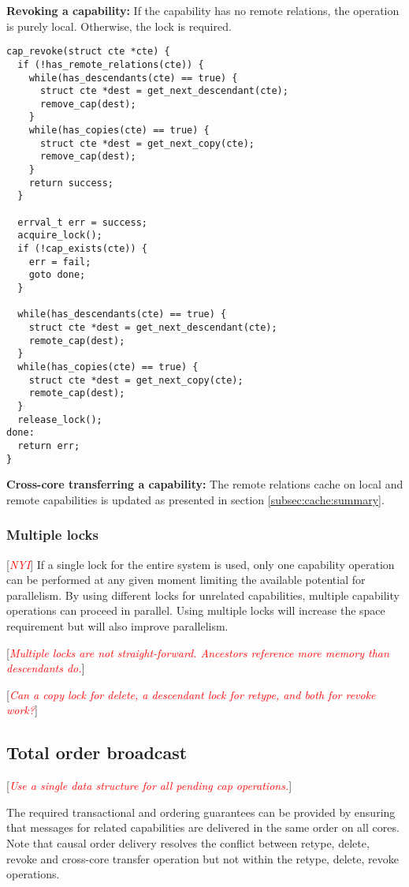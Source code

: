 \documentclass[a4paper,twoside]{report} %
\newcommand{\note}[1]{[\textcolor{red}{\textit{#1}}]}
\begin{document}
\textbf{Revoking a capability:} If the capability has no remote
relations, the operation is purely local. Otherwise, the lock is
required.

\begin{verbatim}
cap_revoke(struct cte *cte) {
  if (!has_remote_relations(cte)) {
    while(has_descendants(cte) == true) {
      struct cte *dest = get_next_descendant(cte);
      remove_cap(dest);
    }
    while(has_copies(cte) == true) {
      struct cte *dest = get_next_copy(cte);
      remove_cap(dest);
    }
    return success;
  }

  errval_t err = success;
  acquire_lock();
  if (!cap_exists(cte)) {
    err = fail;
    goto done;
  }

  while(has_descendants(cte) == true) {
    struct cte *dest = get_next_descendant(cte);
    remote_cap(dest);
  }
  while(has_copies(cte) == true) {
    struct cte *dest = get_next_copy(cte);
    remote_cap(dest);
  }
  release_lock();
done:
  return err;
}
\end{verbatim}

\textbf{Cross-core transferring a capability:} The remote relations
cache on local and remote capabilities is updated as presented in
section \ref{subsec:cache:summary}.

\subsubsection{Multiple locks}
\note{NYI}
If a single lock for the entire system is used, only one capability
operation can be performed at any given moment limiting the available
potential for parallelism. By using different locks for unrelated
capabilities, multiple capability operations can proceed in
parallel. Using multiple locks will increase the space requirement but
will also improve parallelism.

\note{Multiple locks are not straight-forward. Ancestors reference
  more memory than descendants do.}

\note{Can a copy lock for delete, a descendant lock for retype, and
  both for revoke work?}

\subsection{Total order broadcast}
\note{Use a single data structure for all pending cap operations.}

The required transactional and ordering guarantees can be provided by
ensuring that messages for related capabilities are delivered in the
same order on all cores. Note that causal order delivery resolves the
conflict between retype, delete, revoke and cross-core transfer
operation but not within the retype, delete, revoke operations.
\end{document}
